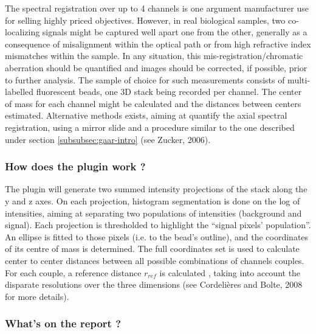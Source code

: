 \documentclass[]{spie}
\begin{document}
The spectral registration over up to 4 channels is one argument manufacturer use for selling highly priced objectives. However, in real biological samples, two co-localizing signals might be captured well apart one from the other, generally as a consequence of misalignment within the optical path or from high refractive index mismatches within the sample. In any situation, this mis-registration/chromatic aberration should be quantified and images should be corrected, if possible, prior to further analysis. The sample of choice for such measurements consists of multi-labelled fluorescent beads, one 3D stack being recorded per channel. The center of mass for each channel might be calculated and the distances between centers estimated. Alternative methods exists, aiming at quantify the axial spectral registration, using a mirror slide and a procedure similar to the one described under section \ref{subsubsec:gaar-intro} (see Zucker, 2006\cite{Zucker2006}).

\subsubsection*{How does the plugin work ?}
\label{subsubsec:gcoar-pgWork}

The plugin will generate two summed intensity projections of the stack along the y and z axes. On each projection, histogram segmentation is done on the log of intensities, aiming at separating two populations of intensities (background and signal). Each projection is thresholded to highlight the ``signal pixels' population''. An ellipse is fitted to those pixels (i.e. to the bead's outline), and the coordinates of its centre of mass is determined. The full coordinates set is used to calculate center to center distances between all possible combinations of channels couples. For each couple, a reference distance $r_{ref}$ is calculated , taking into account the disparate resolutions over the three dimensions (see Cordelières and Bolte, 2008\cite{Cordelieres2008} for more details).

\subsubsection*{What's on the report ?}
\label{subsubsec:gcoar-report}
\end{document}
